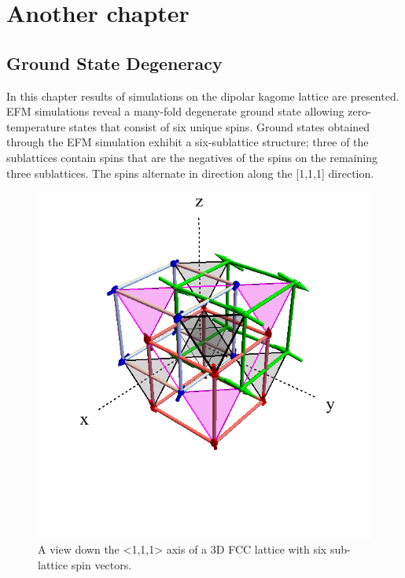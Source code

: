 \chapter{Another chapter}\label{ch:results}

\section{Ground State Degeneracy}
In this chapter results of simulations on the dipolar kagome lattice are presented. EFM simulations reveal a many-fold degenerate ground state allowing zero-temperature states that consist of six unique spins. Ground states obtained through the EFM simulation exhibit a six-sublattice structure; three of the sublattices contain spins that are the negatives of the spins on the remaining three sublattices. The spins alternate in direction along the [1,1,1] direction.

\begin{figure}
	\includegraphics[width=\linewidth]{img/3dfcc.png}
	\caption{A view down the <1,1,1> axis of a 3D FCC lattice with six sub-lattice spin vectors.}
	\label{fig:3dfcc}
\end{figure}

